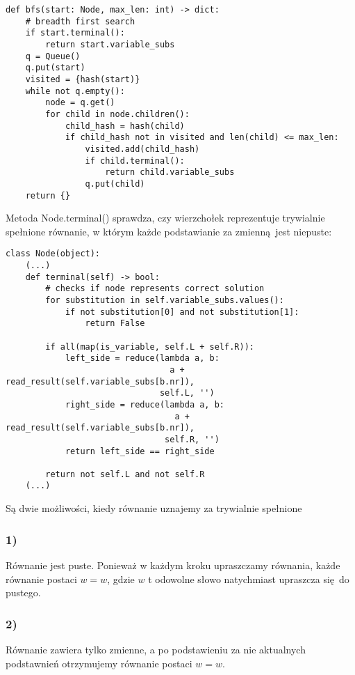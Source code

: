 \documentclass[leqno, 12pt]{article}
\begin{document}
\begin{verbatim}
def bfs(start: Node, max_len: int) -> dict:
    # breadth first search
    if start.terminal():
        return start.variable_subs
    q = Queue()
    q.put(start)
    visited = {hash(start)}
    while not q.empty():
        node = q.get()
        for child in node.children():
            child_hash = hash(child)
            if child_hash not in visited and len(child) <= max_len:
                visited.add(child_hash)
                if child.terminal():
                    return child.variable_subs
                q.put(child)
    return {}
\end{verbatim}

Metoda Node.terminal() sprawdza, czy wierzchołek reprezentuje trywialnie spełnione równanie, w którym każde podstawianie za zmienną jest niepuste:

\begin{verbatim}
class Node(object):
    (...)
    def terminal(self) -> bool:
        # checks if node represents correct solution
        for substitution in self.variable_subs.values():
            if not substitution[0] and not substitution[1]:
                return False

        if all(map(is_variable, self.L + self.R)):
            left_side = reduce(lambda a, b:
                                 a + read_result(self.variable_subs[b.nr]),
                               self.L, '')
            right_side = reduce(lambda a, b:
                                  a + read_result(self.variable_subs[b.nr]),
                                self.R, '')
            return left_side == right_side

        return not self.L and not self.R
    (...)
\end{verbatim}

Są dwie możliwości, kiedy równanie uznajemy za trywialnie spełnione
\subsubsection*{1)}
Równanie jest puste. Ponieważ w każdym kroku upraszczamy równania, każde równanie postaci $w=w$, gdzie $w$ t odowolne słowo natychmiast upraszcza się do pustego.

\subsubsection*{2)}
Równanie zawiera tylko zmienne, a po podstawieniu za nie aktualnych podstawnień otrzymujemy równanie postaci $w=w$. \newline\newline
\end{document}
